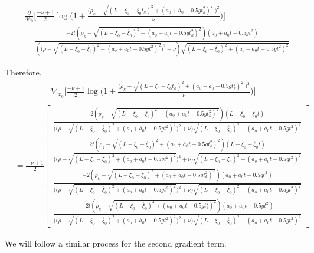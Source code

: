 \documentclass[11pt]{article}
\begin{document}
\begin{enumerate}[label=\alph*)]
\begin{align*}
    &\frac{\partial}{\partial \dot{a_0}}\Bigg[\frac{-\nu+1}{2}\log\Bigg(1+ \frac{\Big(\rho_k - \sqrt{(L-\xi_0 - \dot{\xi_0}t_k)^2 + (a_0 + \dot{a_0} - 0.5gt_k^2)^2} \ \Big)^2}{\nu}\Bigg)\Bigg] \\
    &= \frac{-2t(\rho_k - \sqrt{(L-\xi_0 - \dot{\xi_0})^2 + (a_0 + \dot{a_0}t - 0.5gt_k^2)^2})(a_0+\dot{a_0}t-0.5gt^2)}
    {(\Big(\rho - \sqrt{(L-\xi_0-\dot{\xi_0})^2 + (a_o + \dot{a_0}t-0.5gt^2)^2}\Big)^2 + \nu)\sqrt{(L-\xi_0-\dot{\xi_0})^2 + (a_o + \dot{a_0}t-0.5gt^2)^2}} 
\end{align*}

Therefore, 
\begin{align*}
    \nabla_{x_0}\Bigg[\frac{-\nu+1}{2}\log\Bigg(1+ \frac{\Big(\rho_k - \sqrt{(L-\xi_0 - \dot{\xi_0}t_k)^2 + (a_0 + \dot{a_0} - 0.5gt_k^2)^2} \ \Big)^2}{\nu}\Bigg)\Bigg] \\
\end{align*}
\begin{align}
    &= \frac{-\nu+1}{2} \begin{bmatrix}
        \frac{2(\rho_k - \sqrt{(L-\xi_0 - \dot{\xi_0})^2 + (a_0 + \dot{a_0}t - 0.5gt_k^2)^2})(L-\xi_0-\dot{\xi_0}t)}
    {\Big(\Big(\rho - \sqrt{(L-\xi_0-\dot{\xi_0})^2 + (a_o + \dot{a_0}t-0.5gt^2)^2}\Big)^2 + \nu\Big)\sqrt{(L-\xi_0-\dot{\xi_0})^2 + (a_o + \dot{a_0}t-0.5gt^2)^2}}  \\
    \frac{2t(\rho_k - \sqrt{(L-\xi_0 - \dot{\xi_0})^2 + (a_0 + \dot{a_0}t - 0.5gt_k^2)^2})(L-\xi_0-\dot{\xi_0}t)}
    {\Big(\Big(\rho - \sqrt{(L-\xi_0-\dot{\xi_0})^2 + (a_o + \dot{a_0}t-0.5gt^2)^2}\Big)^2 + \nu\Big)\sqrt{(L-\xi_0-\dot{\xi_0})^2 + (a_o + \dot{a_0}t-0.5gt^2)^2}} \\
    \frac{-2(\rho_k - \sqrt{(L-\xi_0 - \dot{\xi_0})^2 + (a_0 + \dot{a_0}t - 0.5gt_k^2)^2})(a_0+\dot{a_0}t-0.5gt^2)}
    {\Big(\Big(\rho - \sqrt{(L-\xi_0-\dot{\xi_0})^2 + (a_o + \dot{a_0}t-0.5gt^2)^2}\Big)^2 + \nu\Big)\sqrt{(L-\xi_0-\dot{\xi_0})^2 + (a_o + \dot{a_0}t-0.5gt^2)^2}} \\
    \frac{-2t(\rho_k - \sqrt{(L-\xi_0 - \dot{\xi_0})^2 + (a_0 + \dot{a_0}t - 0.5gt_k^2)^2})(a_0+\dot{a_0}t-0.5gt^2)}
    {\Big(\Big(\rho - \sqrt{(L-\xi_0-\dot{\xi_0})^2 + (a_o + \dot{a_0}t-0.5gt^2)^2}\Big)^2 + \nu\Big)\sqrt{(L-\xi_0-\dot{\xi_0})^2 + (a_o + \dot{a_0}t-0.5gt^2)^2}} 
    \end{bmatrix}
    \label{eq:Grad1}
\end{align}

We will follow a similar process for the second gradient term.


\end{enumerate}
\end{document}
